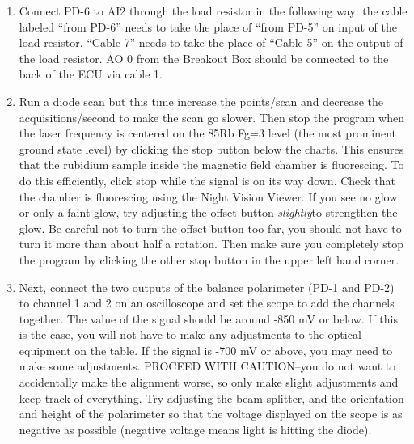 \documentclass{../lab}
\begin{document}
\begin{enumerate}
    \item Connect PD-6 to AI2 through the load resistor in the following way: the cable labeled ``from PD-6'' needs to take the place of ``from PD-5'' on input of the load resistor. ``Cable 7'' needs to take the place of ``Cable 5'' on the output of the load resistor. AO 0 from the Breakout Box should be connected to the back of the ECU via cable 1.

    \item Run a diode scan but this time increase the points/scan and decrease the acquisitions/second to make the scan go slower. Then stop the program when the laser frequency is centered on the 85Rb Fg=3 level (the most prominent ground state level) by clicking the stop button below the charts. This ensures that the rubidium sample inside the magnetic field chamber is fluorescing. To do this efficiently, click stop while the signal is on its way down. Check that the chamber is fluorescing using the Night Vision Viewer. If you see no glow or only a faint glow, try adjusting the offset button \emph{slightly}to strengthen the glow. Be careful not to turn the offset button too far, you should not have to turn it more than about half a rotation. Then make sure you completely stop the program by clicking the other stop button in the upper left hand corner.

    \item Next, connect the two outputs of the balance polarimeter (PD-1 and PD-2) to channel 1 and 2 on an oscilloscope and set the scope to add the channels together. The value of the signal should be around -850 mV or below. If this is the case, you will not have to make any adjustments to the optical equipment on the table. If the signal is -700 mV or above, you may need to make some adjustments. PROCEED WITH CAUTION--you do not want to accidentally make the alignment worse, so only make slight adjustments and keep track of everything. Try adjusting the beam splitter, and the orientation and height of the polarimeter so that the voltage displayed on the scope is as negative as possible (negative voltage means light is hitting the diode).


\end{enumerate}
\end{document}
